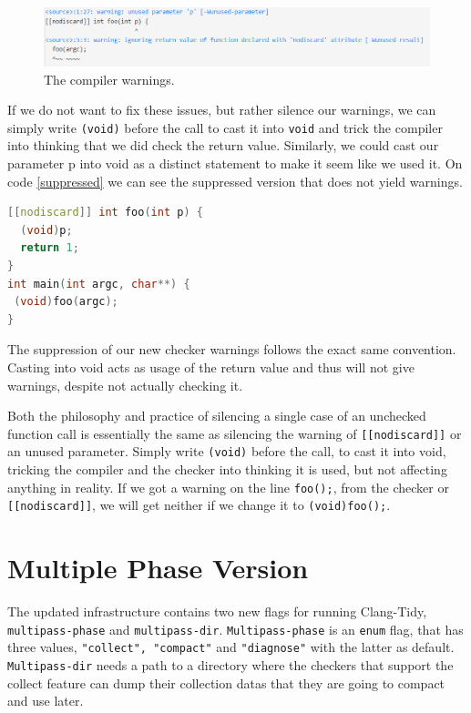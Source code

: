 \begin{figure}[H]
	\includegraphics[width=\linewidth]{images/nodiscard_warning.png}
	\caption{The compiler warnings.}
	\label{fig:compiler warning}
\end{figure}

If we do not want to fix these issues, but rather silence our warnings, we can simply write \lstinline{(void)} before the call
to cast it into \lstinline{void} and trick the compiler into thinking that we did check the return value.
Similarly, we could cast our parameter p into void as a distinct statement to make it seem like we used it. On code \cref{suppressed}
we can see the suppressed version that does not yield warnings.

\begin{lstlisting}[language={C++},caption={The same example, now with suppressed warnings.},label={suppressed}]
[[nodiscard]] int foo(int p) {
  (void)p;
  return 1;
}
int main(int argc, char**) {
 (void)foo(argc);
}
\end{lstlisting}

The suppression of our new checker warnings follows the exact same convention. Casting into void acts as usage of the return
value and thus will not give warnings, despite not actually checking it.








Both the philosophy and practice of silencing a single case of an unchecked function call is essentially the same as silencing the
warning of \texttt{[[nodiscard]]} or an unused parameter. Simply write \lstinline{(void)} before the call, to cast it into void,
tricking the compiler and the checker into thinking it is used, but not affecting anything in reality.
If we got a warning on the line \lstinline{foo();}, from the checker or \texttt{[[nodiscard]]}, we will get neither if we change it
to \lstinline{(void)foo();}.

\section{Multiple Phase Version}

The updated infrastructure contains two new flags for running Clang-Tidy, \texttt{multipass-phase} and \texttt{multipass-dir}.
\texttt{Multipass-phase} is an \lstinline{enum} flag, that has three values, \texttt{"collect", "compact"} and \texttt{"diagnose"}
with the latter as default.
\texttt{Multipass-dir} needs a path to a directory where the checkers that support the collect feature can dump their collection datas
that they are going to compact and use later.


